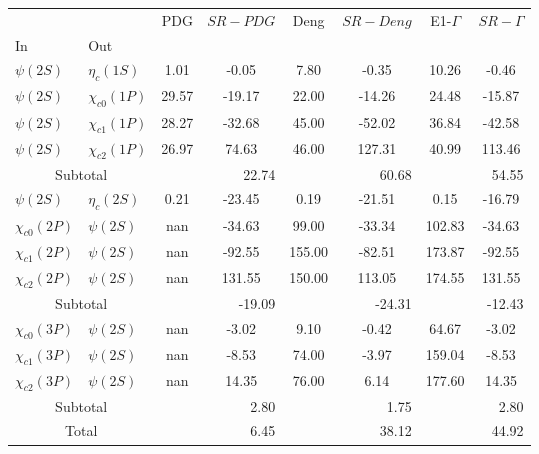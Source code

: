 \begin{tabular}{|l|l|c|c|c|c|c|c|}%
\hline%
&&PDG&$SR-PDG$&Deng&$SR-Deng$&E1-$\Gamma$&$SR-\Gamma$\\%
In&Out&&&&&&\\%
\hline%
$\psi(2S)$&$\eta_{c}(1S)$&1.01&-0.05&7.80&-0.35&10.26&-0.46\\%
$\psi(2S)$&$\chi_{c0}(1P)$&29.57&-19.17&22.00&-14.26&24.48&-15.87\\%
$\psi(2S)$&$\chi_{c1}(1P)$&28.27&-32.68&45.00&-52.02&36.84&-42.58\\%
$\psi(2S)$&$\chi_{c2}(1P)$&26.97&74.63&46.00&127.31&40.99&113.46\\%
\hline%
\hline%
\multicolumn{2}{|c|}{Subtotal}&\multicolumn{2}{|r|}{22.74}&\multicolumn{2}{|r|}{60.68}&\multicolumn{2}{|r|}{54.55}\\%
\hline%
\hline%
$\psi(2S)$&$\eta_{c}(2S)$&0.21&-23.45&0.19&-21.51&0.15&-16.79\\%
$\chi_{c0}(2P)$&$\psi(2S)$&nan&-34.63&99.00&-33.34&102.83&-34.63\\%
$\chi_{c1}(2P)$&$\psi(2S)$&nan&-92.55&155.00&-82.51&173.87&-92.55\\%
$\chi_{c2}(2P)$&$\psi(2S)$&nan&131.55&150.00&113.05&174.55&131.55\\%
\hline%
\hline%
\multicolumn{2}{|c|}{Subtotal}&\multicolumn{2}{|r|}{{-}19.09}&\multicolumn{2}{|r|}{{-}24.31}&\multicolumn{2}{|r|}{{-}12.43}\\%
\hline%
\hline%
$\chi_{c0}(3P)$&$\psi(2S)$&nan&-3.02&9.10&-0.42&64.67&-3.02\\%
$\chi_{c1}(3P)$&$\psi(2S)$&nan&-8.53&74.00&-3.97&159.04&-8.53\\%
$\chi_{c2}(3P)$&$\psi(2S)$&nan&14.35&76.00&6.14&177.60&14.35\\%
\hline%
\hline%
\multicolumn{2}{|c|}{Subtotal}&\multicolumn{2}{|r|}{2.80}&\multicolumn{2}{|r|}{1.75}&\multicolumn{2}{|r|}{2.80}\\%
\hline%
\hline%
\multicolumn{2}{|c|}{Total}&\multicolumn{2}{|r|}{6.45}&\multicolumn{2}{|r|}{38.12}&\multicolumn{2}{|r|}{44.92}\\%
\hline%
\end{tabular}
